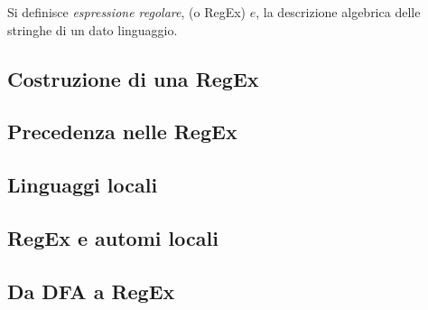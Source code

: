 \documentclass{subfiles}
\begin{document}
\begin{Definition*}
    Si definisce \emph{espressione regolare}, (o RegEx) \(e\), la descrizione algebrica delle stringhe di un dato linguaggio.
\end{Definition*}

\subsection{Costruzione di una RegEx}


\subsection{Precedenza nelle RegEx}


\subsection{Linguaggi locali}


\subsection{RegEx e automi locali}


\subsection{Da DFA a RegEx}

\end{document}

